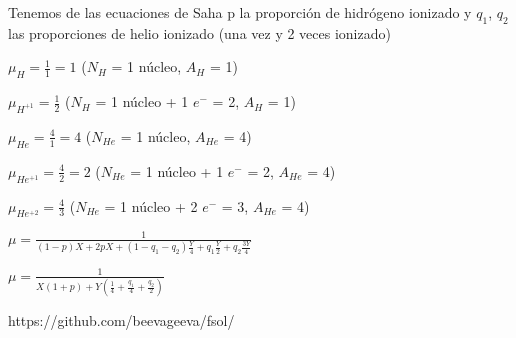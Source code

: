 \documentclass[10pt]{book}
\begin{document}
\begin{description}
\item Tenemos de las ecuaciones  de Saha p la proporción de hidrógeno ionizado y  $q_1$, $q_2$ las proporciones de helio ionizado (una vez y 2 veces ionizado)

$ \mu_H  = \frac{1}{1} = 1$ ($N_H$ = 1 núcleo, $A_H$ = 1)

$ \mu_{H^{+1}}  = \frac{1}{2} $ ($N_H$ = 1 núcleo + 1 $e^-$ = 2, $A_H$ = 1)

$ \mu_{He}  = \frac{4}{1} = 4$ ($N_{He}$ = 1 núcleo, $A_{He}$ = 4)

$ \mu_{He^{+1}}  = \frac{4}{2} = 2$ ($N_{He}$ = 1 núcleo + 1 $e^-$ = 2, $A_{He}$ = 4)

$ \mu_{He^{+2}}  = \frac{4}{3} $ ($N_{He}$ = 1 núcleo + 2 $e^-$ = 3, $A_{He}$ = 4)
 
$ \mu = \frac{1}{(1-p)X + 2pX + (1-q_1-q_2)  \frac{Y}{4} + q_1 \frac{Y}{2} + q_2 \frac{3Y}{4}}$

$ \mu = \frac{1}{X(1 + p) + Y (\frac{1}{4}  + \frac{q_1}{4} + \frac{q_2}{2})}$

\end{description}


 
https://github.com/beevageeva/fsol/
\end{document}
